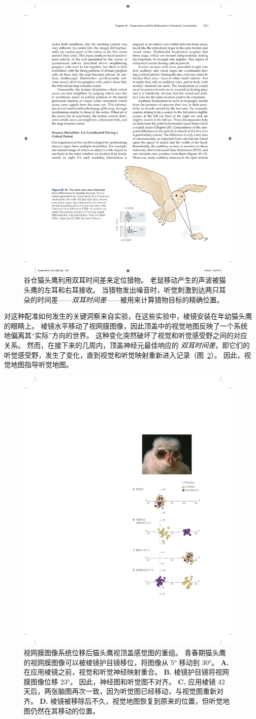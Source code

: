 \begin{figure}[htbp]
	\centering
	\includegraphics[width=0.6\linewidth]{chap49/fig_49_15}
	\caption{谷仓猫头鹰利用双耳时间差来定位猎物。
		老鼠移动产生的声波被猫头鹰的左耳和右耳接收。
		当猎物发出噪音时，听觉刺激到达两只耳朵的时间差——\textit{双耳时间差}——被用来计算猎物目标的精确位置。}
	\label{fig:49_15}
\end{figure}


对这种配准如何发生的关键洞察来自实验，在这些实验中，棱镜安装在年幼猫头鹰的眼睛上。
棱镜水平移动了视网膜图像，因此顶盖中的视觉地图反映了一个系统地偏离其“实际”方向的世界。
这种变化突然破坏了视觉和听觉感受野之间的对应关系。 
然而，在接下来的几周内，顶盖神经元最佳响应的
\textit{双耳时间差}，即它们的听觉感受野，发生了变化，直到视觉和听觉映射重新进入记录（图~\ref{fig:49_16}）。 
因此，视觉地图指导听觉地图。


\begin{figure}[htbp]
	\centering
	\includegraphics[width=0.5\linewidth]{chap49/fig_49_16}
	\caption{视网膜图像系统位移后猫头鹰视顶盖感觉图的重组。
		青春期猫头鹰的视网膜图像可以被棱镜护目镜移位，将图像从 5° 移动到 30°\cite{knudsen2002instructed}。
		\textbf{A.} 在应用棱镜之前，视觉和听觉神经映射重合。
		\textbf{B.} 棱镜护目镜将视网膜图像位移 23°。
		因此，神经图和听觉图不对齐。
		\textbf{C.} 应用棱镜 42 天后，两张脑图再次一致，因为听觉图已经移动，与视觉图重新对齐。
		\textbf{D.} 棱镜被移除后不久，视觉地图恢复到原来的位置，但听觉地图仍然在其移动的位置。}
	\label{fig:49_16}
\end{figure}



